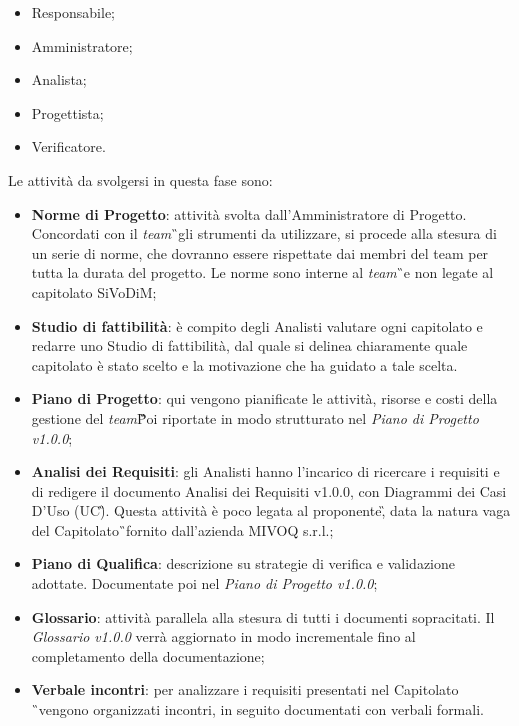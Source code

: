 \begin{itemize}
	\item Responsabile;
	\item Amministratore;
	\item Analista;
	\item Progettista;
	\item Verificatore.
\end{itemize}
Le attività da svolgersi in questa fase sono:
\begin{itemize}
	\item \textbf{Norme di Progetto}: attività svolta dall'Amministratore di 
	Progetto. 
	Concordati con il \textit{team}\G\ gli strumenti da utilizzare, si procede 
	alla stesura di un serie di norme, che dovranno essere rispettate dai 
	membri del team per tutta la durata del progetto. Le norme sono interne al 
	\textit{team}\G\ e non legate al capitolato SiVoDiM;
	\item \textbf{Studio di fattibilità}: è compito degli Analisti valutare 
	ogni capitolato e redarre uno Studio di fattibilità, dal quale si delinea 
	chiaramente quale capitolato è stato scelto e la motivazione che ha guidato 
	a tale scelta.
	\item \textbf{Piano di Progetto}: qui vengono pianificate le attività, 
	risorse e costi della gestione del \textit{team}\G\. Poi riportate in modo 
	strutturato nel \textit{Piano di Progetto v1.0.0};
	\item \textbf{Analisi dei Requisiti}: gli Analisti hanno l'incarico di 
	ricercare i requisiti e di redigere il documento Analisi dei Requisiti 
	v1.0.0, con Diagrammi dei Casi D'Uso (UC\G). Questa attività è poco legata 
	al proponente\G, data la natura vaga del Capitolato\G\ fornito dall'azienda 
	MIVOQ s.r.l.;
	\item \textbf{Piano di Qualifica}: descrizione su strategie di verifica e 
	validazione adottate. Documentate poi nel \textit{Piano di Progetto v1.0.0};
	\item \textbf{Glossario}: attività parallela alla stesura di tutti i 
	documenti sopracitati. Il \textit{Glossario v1.0.0} verrà aggiornato in 
	modo incrementale fino al completamento della documentazione;
	\item \textbf{Verbale incontri}: per analizzare i requisiti presentati nel 
	Capitolato \G\ vengono organizzati incontri, in seguito documentati con 
	verbali formali.
\end{itemize}
